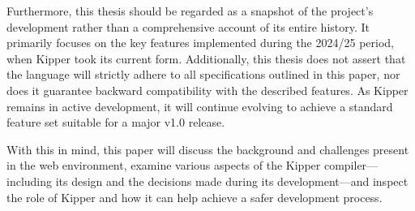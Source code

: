 Furthermore, this thesis should be regarded as a snapshot of the project's development rather than a comprehensive account of its entire history. It primarily focuses on the key features implemented during the 2024/25 period, when Kipper took its current form. Additionally, this thesis does not assert that the language will strictly adhere to all specifications outlined in this paper, nor does it guarantee backward compatibility with the described features. As Kipper remains in active development, it will continue evolving to achieve a standard feature set suitable for a major v1.0 release.

With this in mind, this paper will discuss the background and challenges present in the web environment, examine various aspects of the Kipper compiler—including its design and the decisions made during its development—and inspect the role of Kipper and how it can help achieve a safer development process.

